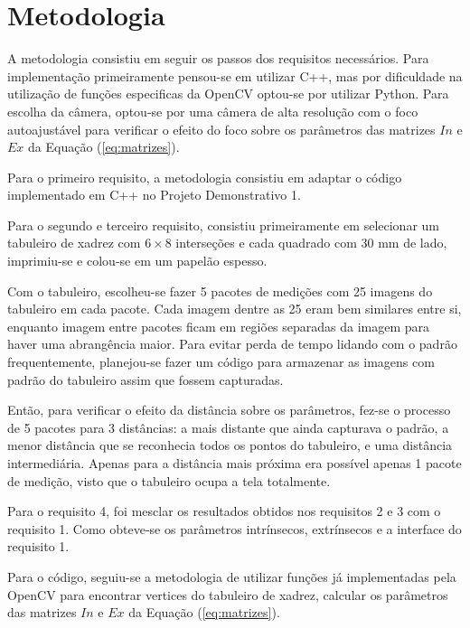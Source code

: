 \section{Metodologia}
\label{metodologia}

A metodologia consistiu em seguir os passos dos requisitos necessários. Para implementação primeiramente pensou-se em utilizar C++, mas por dificuldade na utilização de funções especificas da OpenCV optou-se por utilizar Python. Para escolha da câmera, optou-se por uma câmera de alta resolução com o foco autoajustável para verificar o efeito do foco sobre os parâmetros das matrizes $In$ e $Ex$ da Equação (\ref{eq:matrizes}).

Para o primeiro requisito, a metodologia consistiu em adaptar o código implementado em C++ no Projeto Demonstrativo 1.

Para o segundo e terceiro requisito, consistiu primeiramente em selecionar um tabuleiro de xadrez com $6\times 8$ interseções e cada quadrado com $30$ mm de lado, imprimiu-se e colou-se em um papelão espesso.

Com o tabuleiro, escolheu-se fazer 5 pacotes de medições com 25 imagens do tabuleiro em cada pacote. Cada imagem dentre as 25 eram bem similares entre si, enquanto imagem entre pacotes ficam em regiões separadas da imagem para haver uma abrangência maior. Para evitar perda de tempo lidando com o padrão frequentemente, planejou-se fazer um código para armazenar as imagens com padrão do tabuleiro assim que fossem capturadas.

Então, para verificar o efeito da distância sobre os parâmetros, fez-se o processo de 5 pacotes para 3 distâncias: a mais distante que ainda capturava o padrão, a menor distância que se reconhecia todos os pontos do tabuleiro, e uma distância intermediária. Apenas para a distância mais próxima era possível apenas 1 pacote de medição, visto que o tabuleiro ocupa a tela totalmente.

Para o requisito 4, foi mesclar os resultados obtidos nos requisitos 2 e 3 com o requisito 1. Como obteve-se os parâmetros intrínsecos, extrínsecos e a interface do requisito 1.

Para o código, seguiu-se a metodologia de utilizar funções já implementadas pela OpenCV para encontrar vertices do tabuleiro de xadrez, calcular os parâmetros das matrizes $In$ e $Ex$ da Equação (\ref{eq:matrizes}).